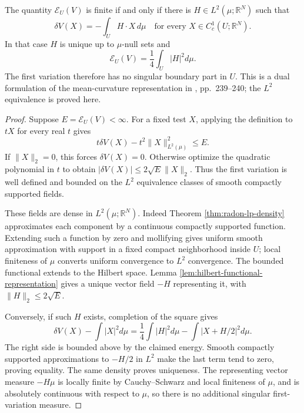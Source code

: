 \begin{theorem}\label{thm:varifold-energy-dual-representation}
The quantity $\mathcal E_U(V)$ is finite if and only if there is $H\in L^2(\mu;\mathbb R^N)$ such that
\[
 \delta V(X)=-\int_UH\cdot X\,d\mu
 \quad\text{for every }X\in C_c^1(U;\mathbb R^N).
\]
In that case $H$ is unique up to $\mu$-null sets and
\[
 \mathcal E_U(V)=\frac14\int_U|H|^2d\mu.
\]
The first variation therefore has no singular boundary part in $U$. This is a dual formulation of the mean-curvature representation in \cite{Sim18}, pp.~239--240; the $L^2$ equivalence is proved here.
\end{theorem}
\begin{proof}
Suppose $E=\mathcal E_U(V)<\infty$. For a fixed test $X$, applying the definition to $tX$ for every real $t$ gives
\[
 t\delta V(X)-t^2\|X\|_{L^2(\mu)}^2\leq E.
\]
If $\|X\|_2=0$, this forces $\delta V(X)=0$. Otherwise optimize the quadratic polynomial in $t$ to obtain
$|\delta V(X)|\leq2\sqrt E\|X\|_2$.
Thus the first variation is well defined and bounded on the $L^2$ equivalence classes of smooth compactly supported fields.

These fields are dense in $L^2(\mu;\mathbb R^N)$. Indeed Theorem \ref{thm:radon-lp-density} approximates each component by a continuous compactly supported function. Extending such a function by zero and mollifying gives uniform smooth approximation with support in a fixed compact neighborhood inside $U$; local finiteness of $\mu$ converts uniform convergence to $L^2$ convergence. The bounded functional extends to the Hilbert space. Lemma \ref{lem:hilbert-functional-representation} gives a unique vector field $-H$ representing it, with $\|H\|_2\leq2\sqrt E$.

Conversely, if such $H$ exists, completion of the square gives
\[
 \delta V(X)-\int|X|^2d\mu
 =\frac14\int|H|^2d\mu-\int|X+H/2|^2d\mu.
\]
The right side is bounded above by the claimed energy. Smooth compactly supported approximations to $-H/2$ in $L^2$ make the last term tend to zero, proving equality. The same density proves uniqueness. The representing vector measure $-H\mu$ is locally finite by Cauchy--Schwarz and local finiteness of $\mu$, and is absolutely continuous with respect to $\mu$, so there is no additional singular first-variation measure.
\end{proof}

